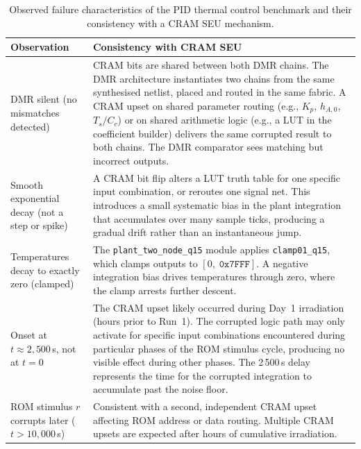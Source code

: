 \begin{table}[htbp]
\centering
\small
\caption{Observed failure characteristics of the PID thermal control
         benchmark and their consistency with a CRAM SEU mechanism.}
\label{tab:bench_cram_evidence}
\renewcommand{\arraystretch}{1.25}
\begin{tabular}{@{} p{4.5cm} p{8.5cm} @{}}
\toprule
\textbf{Observation} & \textbf{Consistency with CRAM SEU} \\
\midrule
DMR silent (no mismatches detected) &
CRAM bits are shared between both DMR chains.  The DMR architecture
instantiates two chains from the same synthesised netlist, placed and
routed in the same fabric.  A CRAM upset on shared parameter routing
(e.g., $K_p$, $h_{A,0}$, $T_s/C_c$) or on shared arithmetic logic
(e.g., a LUT in the coefficient builder) delivers the same corrupted
result to both chains.  The DMR comparator sees matching but incorrect
outputs. \\
\addlinespace
Smooth exponential decay (not a step or spike) &
A CRAM bit flip alters a LUT truth table for one specific input
combination, or reroutes one signal net.  This introduces a small
systematic bias in the plant integration that accumulates over many
sample ticks, producing a gradual drift rather than an instantaneous
jump. \\
\addlinespace
Temperatures decay to exactly zero (clamped) &
The \texttt{plant\_two\_node\_q15} module applies
\texttt{clamp01\_q15}, which clamps outputs to $[0,\;\texttt{0x7FFF}]$.
A negative integration bias drives temperatures through zero, where the
clamp arrests further descent. \\
\addlinespace
Onset at $t \approx 2{,}500$\,s, not at $t = 0$ &
The CRAM upset likely occurred during Day~1 irradiation (hours prior to
Run~1).  The corrupted logic path may only activate for specific input
combinations encountered during particular phases of the ROM stimulus
cycle, producing no visible effect during other phases.  The
2\,500\,s delay represents the time for the corrupted integration to
accumulate past the noise floor. \\
\addlinespace
ROM stimulus $r$ corrupts later ($t > 10{,}000$\,s) &
Consistent with a second, independent CRAM upset affecting ROM address
or data routing.  Multiple CRAM upsets are expected after hours of
cumulative irradiation. \\
\bottomrule
\end{tabular}
\end{table}

